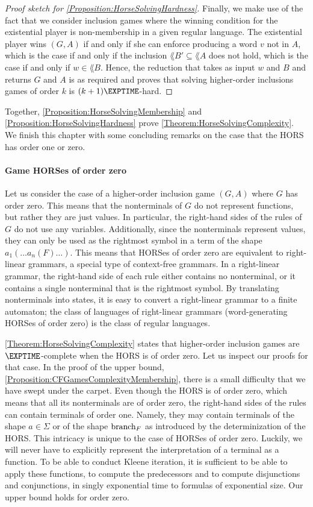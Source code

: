 \documentclass[../../diss.tex]{subfiles}
\begin{document}
\begin{proof}[Proof sketch for \cref{Proposition:HorseSolvingHardness}]
    Finally, we make use of the fact that we consider inclusion games where the winning condition for the existential player is non-membership in a given regular language.
    The existential player wins $(G,A)$ if and only if she can enforce producing a word $v$ not in $A$, which is the case if and only if the inclusion $\lang{B'} \subseteq \lang{A}$ does not hold, which is the case if and only if $w \in \lang{B}$.
    Hence, the reduction that takes as input $w$ and $B$ and returns $G$ and $A$ is as required and proves that solving higher-order inclusions games of order $k$ is $(k+1)\EXPTIME$-hard.
\end{proof}

Together, \cref{Proposition:HorseSolvingMembership} and \cref{Proposition:HorseSolvingHardness} prove \cref{Theorem:HorseSolvingComplexity}.
We finish this chapter with some concluding remarks on the case that the HORS has order one or zero.

\paragraph{Game HORSes of order zero}

Let us consider the case of a higher-order inclusion game $(G,A)$ where $G$ has order zero.
This means that the nonterminals of $G$ do not represent functions, but rather they are just values.
In particular, the right-hand sides of the rules of $G$ do not use any variables.
Additionally, since the nonterminals represent values, they can only be used as the rightmost symbol in a term of the shape $a_1 ( \ldots a_n (F)\ldots)$.
This means that HORSes of order zero are equivalent to right-linear grammars, a special type of context-free grammars.
In a right-linear grammar, the right-hand side of each rule either contains no nonterminal, or it contains a single nonterminal that is the rightmost symbol.
By translating nonterminals into states, it is easy to convert a right-linear grammar to a finite automaton; the class of languages of right-linear grammars (\resp word-generating HORSes of order zero) is the class of regular languages.

\cref{Theorem:HorseSolvingComplexity} states that higher-order inclusion games are $\EXPTIME$-complete when the HORS is of order zero.
Let us inspect our proofs for that case.
In the proof of the upper bound, \cref{Proposition:CFGamesComplexityMembership}, there is a small difficulty that we have swept under the carpet.
Even though the HORS is of order zero, which means that all its nonterminals are of order zero, the right-hand sides of the rules can contain terminals of order one.
Namely, they may contain terminals of the shape $a \in \Sigma$ or of the shape $\text{branch}_F$ as introduced by the determinization of the HORS.\@
This intricacy is unique to the case of HORSes of order zero.
Luckily, we will never have to explicitly represent the interpretation of a terminal as a function.
To be able to conduct Kleene iteration, it is sufficient to be able to apply these functions, \ie to compute the predecessors and to compute disjunctions and conjunctions, in singly exponential time to formulas of exponential size.
Our upper bound holds for order zero.
\end{document}
